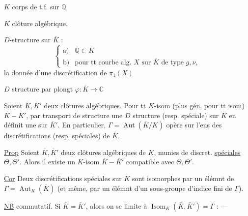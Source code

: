 $K$ corps de t.f. sur $\mathbb Q$

$\overline K$ clôture algébrique.

$D$-structure sur $\overline K$ :
\[
\left\{\begin{array}{ll}
\text{a)}&\overline{\mathbb Q}\subset\overline K\\
\text{b)}&\text{pour tt courbe alg. }X\text{ sur }\overline K\text{ de type }g,\nu,
\end{array}\right.
\]
la donnée d'une discrétification de $\pi_1(X)$

$D$ structure   par plongt
$\varphi:\overline K\longrightarrow\mathbb C$


Soient $\overline K,\overline K'$ deux clôtures algébriques.
Pour tt  $K$-isom (plus gén, pour tt isom)
$\overline K\mathbin{-}\overline K'$, par transport de structure une $D$ structure
(resp. spéciale) sur $\overline K$ en définit une sur $\overline K'$.
En particulier, $\Gamma=\operatorname{Aut}(\overline K/K)$ opère sur l'ens des
discrétifications (resp. spéciales) de $\overline K$.

\uline{Prop} Soient $\overline K,\overline K'$ deux clôtures algébriques de $K$,
munies de discret. \uline{spéciales} $\Theta,\Theta'$. Alors il existe un
$K$-isom $\overline K\mathbin{-}\overline K'$ compatible avec $\Theta,\Theta'$.

\uline{Cor} Deux discrétifications spéciales sur $\overline K$ sont isomorphes
par un élémnt de $\Gamma=\operatorname{Aut}_K(\overline K)$ (et même, par un élémnt
d'un sous-groupe d'indice fini  de $\Gamma$).

\uline{NB}
  commutatif.
Si $\overline K=\overline K'$, alors on se limite à
$\operatorname{Isom}_K(\overline K,\overline K')=\Gamma$ : --- 
